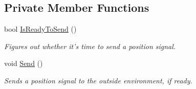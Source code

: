 \subsection*{Private Member Functions}
\begin{DoxyCompactItemize}
\item 
bool \hyperlink{classPlayerPosition_a52f46d4c600724b7ce9f459b93609dc3}{Is\+Ready\+To\+Send} ()
\begin{DoxyCompactList}\small\item\em Figures out whether it's time to send a position signal. \end{DoxyCompactList}\item 
void \hyperlink{classPlayerPosition_aac73ce9104537702365baf19d50bde14}{Send} ()
\begin{DoxyCompactList}\small\item\em Sends a position signal to the outside environment, if ready. \end{DoxyCompactList}\end{DoxyCompactItemize}
